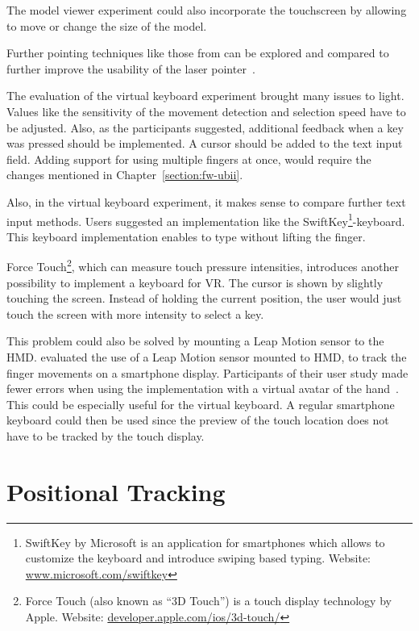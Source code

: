 The model viewer experiment could also incorporate the touchscreen by allowing to move or change the size of the model.

Further pointing techniques like those from \citeauthor{Argelaguet.2013} can be explored and compared to further improve the usability of the laser pointer~\cite[123]{Argelaguet.2013}.

The evaluation of the virtual keyboard experiment brought many issues to light. 
Values like the sensitivity of the movement detection and selection speed have to be adjusted. Also, as the participants suggested, additional feedback when a key was pressed should be implemented. A cursor should be added to the text input field. Adding support for using multiple fingers at once, would require the changes mentioned in Chapter~\ref{section:fw-ubii}.

Also, in the virtual keyboard experiment, it makes sense to compare further text input methods. Users suggested an implementation like the SwiftKey\footnote{SwiftKey by Microsoft is an application for smartphones which allows to customize the keyboard and introduce swiping based typing. Website: \href{https://www.microsoft.com/swiftkey}{www.microsoft.com/swiftkey}}-keyboard. This keyboard implementation enables to type without lifting the finger. 

Force Touch\footnote{Force Touch (also known as \enquote{3D Touch}) is a touch display technology by Apple. Website: \href{https://developer.apple.com/ios/3d-touch/}{developer.apple.com/ios/3d-touch/}}, which can measure touch pressure intensities, introduces another possibility to implement a keyboard for \ac{VR}. The cursor is shown by slightly touching the screen. Instead of holding the current position, the user would just touch the screen with more intensity to select a key. 

This problem could also be solved by mounting a Leap Motion sensor to the \ac{HMD}. \citeauthor{Afonso.2017} evaluated the use of a Leap Motion sensor mounted to \ac{HMD}, to track the finger movements on a smartphone display. Participants of their user study made fewer errors when using the implementation with a virtual avatar of the hand~\cite[247\psq]{Afonso.2017}. This could be especially useful for the virtual keyboard. A regular smartphone keyboard could then be used since the preview of the touch location does not have to be tracked by the touch display.



\section{Positional Tracking}\label{section:fw-positional-tracking}

